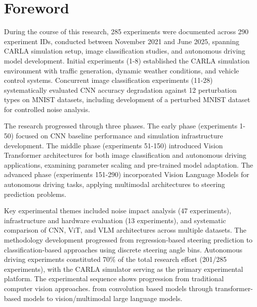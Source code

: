 \section{Foreword}
During the course of this research, 285 experiments were documented across 290 experiment IDs, conducted between November 2021 and June 2025, spanning CARLA simulation setup, image classification studies, and autonomous driving model development. Initial experiments (1-8) established the CARLA simulation environment with traffic generation, dynamic weather conditions, and vehicle control systems. Concurrent image classification experiments (11-28) systematically evaluated CNN accuracy degradation against 12 perturbation types on MNIST datasets, including development of a perturbed MNIST dataset for controlled noise analysis.

The research progressed through three phases. The early phase (experiments 1-50) focused on CNN baseline performance and simulation infrastructure development. The middle phase (experiments 51-150) introduced Vision Transformer architectures for both image classification and autonomous driving applications, examining parameter scaling and pre-trained model adaptation. The advanced phase (experiments 151-290) incorporated Vision Language Models for autonomous driving tasks, applying multimodal architectures to steering prediction problems.

Key experimental themes included noise impact analysis (47 experiments), infrastructure and hardware evaluation (13 experiments), and systematic comparison of CNN, ViT, and VLM architectures across multiple datasets. The methodology development progressed from regression-based steering prediction to classification-based approaches using discrete steering angle bins. Autonomous driving experiments constituted 70\% of the total research effort (201/285 experiments), with the CARLA simulator serving as the primary experimental platform. The experimental sequence shows progression from traditional computer vision approaches. from convolution based models through transformer-based models to vision/multimodal large language models.








